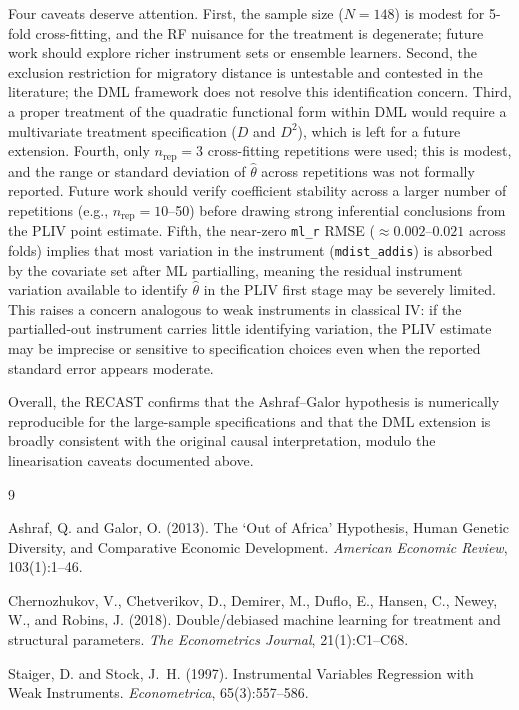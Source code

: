 \documentclass[12pt,letterpaper]{article}
\begin{document}
Four caveats deserve attention.
First, the sample size ($N = 148$) is modest for 5-fold cross-fitting, and
the RF nuisance for the treatment is degenerate; future work should explore
richer instrument sets or ensemble learners.
Second, the exclusion restriction for migratory distance is untestable and
contested in the literature; the DML framework does not resolve this
identification concern.
Third, a proper treatment of the quadratic functional form within DML
would require a multivariate treatment specification ($D$ and $D^2$),
which is left for a future extension.
Fourth, only $n_{\mathrm{rep}} = 3$ cross-fitting repetitions were used;
this is modest, and the range or standard deviation of $\hat{\theta}$ across
repetitions was not formally reported. Future work should verify coefficient
stability across a larger number of repetitions (e.g., $n_{\mathrm{rep}} = 10$--50)
before drawing strong inferential conclusions from the PLIV point estimate.
Fifth, the near-zero \texttt{ml\_r} RMSE ($\approx 0.002$--$0.021$ across folds)
implies that most variation in the instrument (\texttt{mdist\_addis}) is absorbed
by the covariate set after ML partialling, meaning the residual instrument
variation available to identify $\hat{\theta}$ in the PLIV first stage may be
severely limited. This raises a concern analogous to weak instruments in classical
IV: if the partialled-out instrument carries little identifying variation, the
PLIV estimate may be imprecise or sensitive to specification choices even when
the reported standard error appears moderate.

Overall, the RECAST confirms that the Ashraf--Galor hypothesis is numerically
reproducible for the large-sample specifications and that the DML extension
is broadly consistent with the original causal interpretation, modulo the
linearisation caveats documented above.

\begin{thebibliography}{9}

Ashraf, Q. and Galor, O. (2013).
\newblock The `Out of Africa' Hypothesis, Human Genetic Diversity, and
  Comparative Economic Development.
\newblock \textit{American Economic Review}, 103(1):1--46.

Chernozhukov, V., Chetverikov, D., Demirer, M., Duflo, E., Hansen, C.,
  Newey, W., and Robins, J. (2018).
\newblock Double/debiased machine learning for treatment and structural
  parameters.
\newblock \textit{The Econometrics Journal}, 21(1):C1--C68.

Staiger, D. and Stock, J.~H. (1997).
\newblock Instrumental Variables Regression with Weak Instruments.
\newblock \textit{Econometrica}, 65(3):557--586.

\end{thebibliography}
\end{document}
